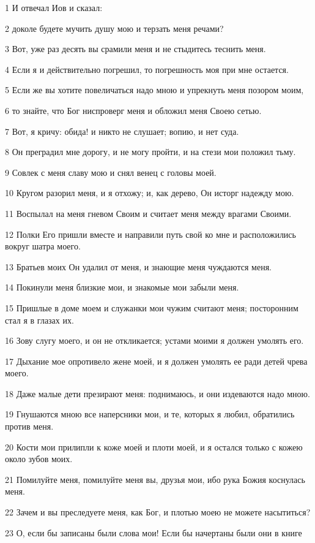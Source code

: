 \par 1 И отвечал Иов и сказал:
\par 2 доколе будете мучить душу мою и терзать меня речами?
\par 3 Вот, уже раз десять вы срамили меня и не стыдитесь теснить меня.
\par 4 Если я и действительно погрешил, то погрешность моя при мне остается.
\par 5 Если же вы хотите повеличаться надо мною и упрекнуть меня позором моим,
\par 6 то знайте, что Бог ниспроверг меня и обложил меня Своею сетью.
\par 7 Вот, я кричу: обида! и никто не слушает; вопию, и нет суда.
\par 8 Он преградил мне дорогу, и не могу пройти, и на стези мои положил тьму.
\par 9 Совлек с меня славу мою и снял венец с головы моей.
\par 10 Кругом разорил меня, и я отхожу; и, как дерево, Он исторг надежду мою.
\par 11 Воспылал на меня гневом Своим и считает меня между врагами Своими.
\par 12 Полки Его пришли вместе и направили путь свой ко мне и расположились вокруг шатра моего.
\par 13 Братьев моих Он удалил от меня, и знающие меня чуждаются меня.
\par 14 Покинули меня близкие мои, и знакомые мои забыли меня.
\par 15 Пришлые в доме моем и служанки мои чужим считают меня; посторонним стал я в глазах их.
\par 16 Зову слугу моего, и он не откликается; устами моими я должен умолять его.
\par 17 Дыхание мое опротивело жене моей, и я должен умолять ее ради детей чрева моего.
\par 18 Даже малые дети презирают меня: поднимаюсь, и они издеваются надо мною.
\par 19 Гнушаются мною все наперсники мои, и те, которых я любил, обратились против меня.
\par 20 Кости мои прилипли к коже моей и плоти моей, и я остался только с кожею около зубов моих.
\par 21 Помилуйте меня, помилуйте меня вы, друзья мои, ибо рука Божия коснулась меня.
\par 22 Зачем и вы преследуете меня, как Бог, и плотью моею не можете насытиться?
\par 23 О, если бы записаны были слова мои! Если бы начертаны были они в книге
